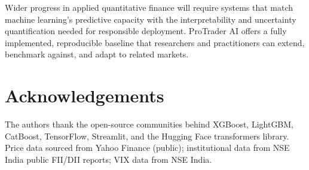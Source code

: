 \documentclass[10pt,a4paper,twoside]{article}
\begin{document}
Wider progress in applied quantitative finance will require systems that match
machine learning's predictive capacity with the interpretability and uncertainty
quantification needed for responsible deployment. ProTrader AI offers a fully
implemented, reproducible baseline that researchers and practitioners can
extend, benchmark against, and adapt to related markets.

\section*{Acknowledgements}

The authors thank the open-source communities behind XGBoost, LightGBM,
CatBoost, TensorFlow, Streamlit, and the Hugging Face transformers library.
Price data sourced from Yahoo Finance (public); institutional data from
NSE India public FII/DII reports; VIX data from NSE India.



\end{document}
